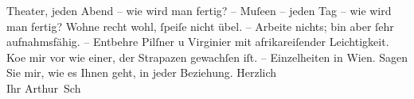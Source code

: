 \begin{ledgroupsized}[t]{13cm}
               Theater, jeden Abend – wie wird man fertig? – Muſeen – jeden Tag – wie wird man
               fertig? Wohne recht wohl, ſpeiſe nicht übel. – Arbeite nichts; bin aber ſehr
               aufnahmsfähig. – {\pb}Entbehre Pilſner u
               Virginier mit afrikareiſender Leichtigkeit.
                  Ko{\geminationm}e mir vor wie einer, der Strapazen gewachſen iſt.
               –\pend
           \pstart
           Einzelheiten in Wien.\pend
           \pstart
           Sagen Sie mir, wie es Ihnen geht, in jeder Beziehung. Herzlich {\\}Ihr
                  \spacefill\mbox{Arthur Sch}\pend
           
         
         \endnumbering{}\end{ledgroupsized}  \newcommand{\dateiname}{L02963}\newcommand{\titel}{Arthur Schnitzler an Felix Salten, 26. 4. 1897}\newcommand{\editorInnen}{Martin Anton Müller und Laura Untner}
      